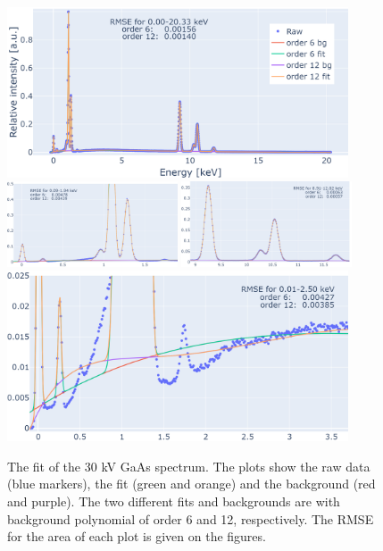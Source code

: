 
\begin{figure}[p]
    \centering
    \includegraphics[width=0.9\textwidth]{figures/fit/fit_GaAs30kV_whole.png}
    \includegraphics[width=0.45\textwidth]{figures/fit/fit_GaAs30kV_L.png}
    \includegraphics[width=0.45\textwidth]{figures/fit/fit_GaAs30kV_K.png}
    \includegraphics[width=0.9\textwidth]{figures/fit/fit_GaAs30kV_bg.png}
    \caption{
        The fit of the 30 kV GaAs spectrum.
        The plots show the raw data (blue markers), the fit (green and orange) and the background (red and purple).
        The two different fits and backgrounds are with background polynomial of order 6 and 12, respectively.
        The RMSE for the area of each plot is given on the figures.
    }
    \label{fig:results:fit_GaAs30kV}
\end{figure}

